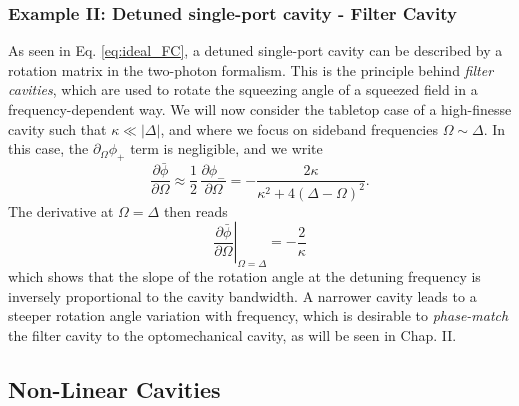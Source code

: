 \subsubsection{Example II: Detuned single-port cavity - Filter Cavity}
As seen in Eq. \eqref{eq:ideal_FC}, a detuned single-port cavity can be described by a rotation matrix in the two-photon formalism. This is the principle behind \textit{filter cavities}, which are used to rotate the squeezing angle of a squeezed field in a frequency-dependent way. We will now consider the tabletop case of a high-finesse cavity such that $\kappa \ll |\Delta|$, and where we focus on sideband frequencies $\Omega \sim \Delta$. In this case, the $\partial_\Omega \phi_+$ term is negligible, and we write
\begin{equation}
  \dfrac{\partial \bar \phi}{\partial \Omega} \approx  \dfrac{1}{2} \, \dfrac{\partial \phi_-}{\partial \Omega} = - \dfrac{2\kappa}{\kappa^2 + 4(\Delta - \Omega)^2}.
\end{equation}
The derivative at $\Omega = \Delta$ then reads 
\begin{equation}
  \left.\dfrac{\partial \bar \phi}{\partial \Omega}\right|_{\Omega = \Delta} = - \dfrac{2}{\kappa}
  \label{eq:derivative_FC}
\end{equation}
which shows that the slope of the rotation angle at the detuning frequency is inversely proportional to the cavity bandwidth. A narrower cavity leads to a steeper rotation angle variation with frequency, which is desirable to \textit{phase-match} the filter cavity to the optomechanical cavity, as will be seen in Chap. II. 

\subsection{Non-Linear Cavities}





